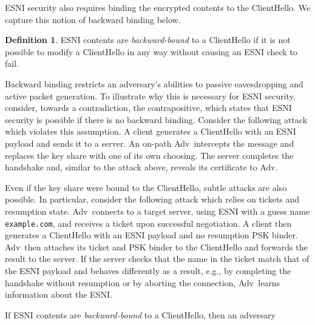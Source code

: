 \documentclass{article}
\newcommand{\adv}{{\sf Adv}}
\theoremstyle{definition}
\newtheorem{definition}{Definition}[section]
\begin{document}
ESNI security also requires binding the encrypted contents to the ClientHello. We capture this 
notion of backward binding below.

\begin{definition}
ESNI contents are \emph{backward-bound} to a ClientHello if it is not possible to modify a ClientHello in 
any way without causing an ESNI check to fail.
\end{definition}

Backward binding restricts an adversary's abilities to passive eavesdropping and active packet generation.
To illustrate why this is necessary for ESNI security, consider, towards a contradiction, the contrapositive,
which states that ESNI security is possible if there is no backward binding. Consider the following attack
which violates this assumption. A client generates a ClientHello with an ESNI payload and sends it to a server.
An on-path \adv\ intercepts the message and replaces the key share with one of its own choosing. The server
completes the handshake and, similar to the attack above, reveals its certificate to \adv. 

Even if the key share were bound to the ClientHello, subtle attacks are also possible. In particular, consider
the following attack which relies on tickets and resumption state. \adv\ connects to a target server, using ESNI 
with a guess name {\tt example.com}, and receives a ticket upon successful negotiation. A client then
generates a ClientHello with an ESNI payload and no resumption PSK binder. \adv\ then attaches its ticket and 
PSK binder to the ClientHello and forwards the result to the server. If the server checks that the name in 
the ticket match that of the ESNI payload and behaves differently as a result, e.g., by completing the handshake
without resumption or by aborting the connection, \adv\ learns information about the ESNI.



\begin{theorem}
If ESNI contents are \emph{backward-bound} to a ClientHello, then an adversary
\end{theorem}




\end{document}
